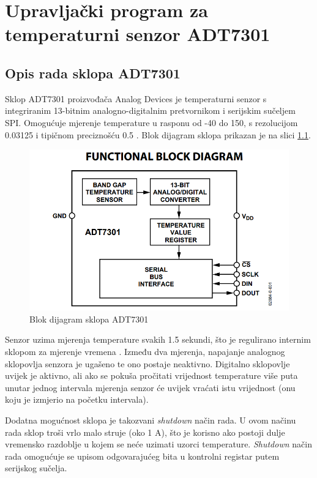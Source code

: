 \chapter{Upravljački program za temperaturni senzor ADT7301}

\section{Opis rada sklopa ADT7301}
	Sklop ADT7301 proizvođača Analog Devices je temperaturni senzor s integriranim 13-bitnim analogno-digitalnim pretvornikom i serijskim sučeljem SPI. Omogućuje mjerenje temperature u rasponu od -40\textcelsius{} do 150\textcelsius{}, s rezolucijom 0.03125\textcelsius{} i tipičnom preciznošću \textpm{} 0.5\textcelsius{} \citep{adt7301}. Blok dijagram sklopa prikazan je na slici \ref{fig:adt7301_blok_dijagram}.
	
	\begin{figure}[htb]
		\centering
		\includegraphics{slike/ADT7301_blok_dijagram.png}
		\caption{Blok dijagram sklopa ADT7301}
		\label{fig:adt7301_blok_dijagram}
	\end{figure}

	Senzor uzima mjerenja temperature svakih 1.5 sekundi, što je regulirano internim sklopom za mjerenje vremena . Između dva mjerenja, napajanje analognog sklopovlja senzora je ugašeno te ono postaje neaktivno. Digitalno sklopovlje uvijek je aktivno, ali ako se pokuša pročitati vrijednost temperature više puta unutar jednog intervala mjerenja senzor će uvijek vraćati istu vrijednost (onu koju je izmjerio na početku intervala).
	
	Dodatna mogućnost sklopa je takozvani \textit{shutdown} način rada. U ovom načinu rada sklop troši vrlo malo struje (oko 1 \textmu{}A), što je korisno ako postoji dulje vremensko razdoblje u kojem se neće uzimati uzorci temperature. \textit{Shutdown} način rada omogućuje se upisom odgovarajućeg bita u kontrolni registar putem serijskog sučelja.
	
